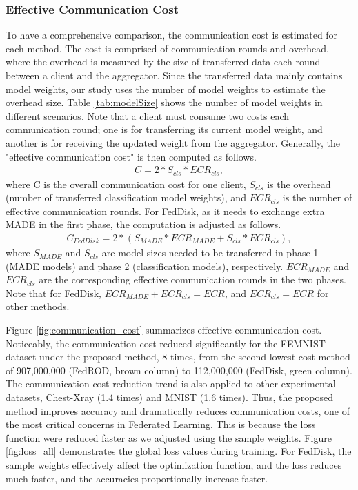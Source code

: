 \documentclass[journal]{IEEEtai}
\begin{document}
\subsubsection{Effective Communication Cost}

To have a comprehensive comparison, the communication cost is estimated for each method. The cost is comprised of communication rounds and overhead, where the overhead is measured by the size of transferred data each round between a client and the aggregator. Since the transferred data mainly contains model weights, our study uses the number of model weights to estimate the overhead size. Table \ref{tab:modelSize} shows the number of model weights in different scenarios. Note that a client must consume two costs each communication round; one is for transferring its current model weight, and another is for receiving the updated weight from the aggregator. Generally, the "effective communication cost" is then computed as follows. 
\begin{align}
    C = 2*S_{cls}*ECR_{cls} ,
\end{align}
where C is the overall communication cost for one client, $S_{cls}$ is the overhead (number of transferred classification model weights), and $ECR_{cls}$ is the number of effective communication rounds. For FedDisk, as it needs to exchange extra MADE in the first phase, the computation is adjusted as follows.
\begin{align}
    C_{FedDisk} = 2* (S_{MADE}*ECR_{MADE} + S_{cls}*ECR_{cls}) ,
\end{align}
where $S_{MADE}$ and $S_{cls}$ are model sizes needed to be transferred in phase 1 (MADE models) and phase 2 (classification models), respectively. $ECR_{MADE}$ and $ECR_{cls}$ are the corresponding effective communication rounds in the two phases. Note that for FedDisk, $ECR_{MADE} + ECR_{cls} = ECR$, and $ECR_{cls} = ECR$ for other methods.  

Figure \ref{fig:communication_cost} summarizes effective communication cost. Noticeably, the communication cost reduced significantly for the FEMNIST dataset under the proposed method, 8 times, from the second lowest cost method of 907,000,000 (FedROD, brown column) to 112,000,000 (FedDisk, green column). The communication cost reduction trend is also applied to other experimental datasets, Chest-Xray (1.4 times) and MNIST (1.6 times). Thus, the proposed method improves accuracy and dramatically reduces communication costs, one of the most critical concerns in Federated Learning. This is because the loss function were reduced faster as we adjusted using the sample weights. Figure \ref{fig:loss_all} demonstrates the global loss values during training. For FedDisk, the sample weights effectively affect the optimization function, and the loss reduces much faster, and the accuracies proportionally increase faster.   
\end{document}
